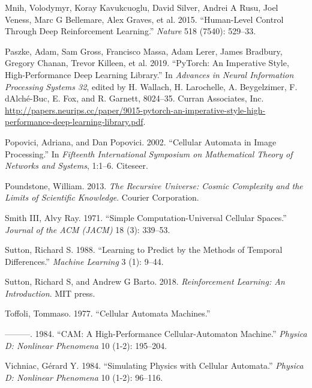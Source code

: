 \documentclass[
  openany]{book}
\newlength{\cslhangindent}
\newenvironment{cslreferences}%
  {\setlength{\parindent}{0pt}%
  \everypar{\setlength{\hangindent}{\cslhangindent}}\ignorespaces}%
  {\par}
\begin{document}
\begin{cslreferences}
\leavevmode\hypertarget{ref-mnih2015human}{}%
Mnih, Volodymyr, Koray Kavukcuoglu, David Silver, Andrei A Rusu, Joel Veness, Marc G Bellemare, Alex Graves, et al. 2015. ``Human-Level Control Through Deep Reinforcement Learning.'' \emph{Nature} 518 (7540): 529--33.

\leavevmode\hypertarget{ref-NEURIPS2019_9015}{}%
Paszke, Adam, Sam Gross, Francisco Massa, Adam Lerer, James Bradbury, Gregory Chanan, Trevor Killeen, et al. 2019. ``PyTorch: An Imperative Style, High-Performance Deep Learning Library.'' In \emph{Advances in Neural Information Processing Systems 32}, edited by H. Wallach, H. Larochelle, A. Beygelzimer, F. d\textquotesingle Alché-Buc, E. Fox, and R. Garnett, 8024--35. Curran Associates, Inc. \url{http://papers.neurips.cc/paper/9015-pytorch-an-imperative-style-high-performance-deep-learning-library.pdf}.

\leavevmode\hypertarget{ref-popovici2002cellular}{}%
Popovici, Adriana, and Dan Popovici. 2002. ``Cellular Automata in Image Processing.'' In \emph{Fifteenth International Symposium on Mathematical Theory of Networks and Systems}, 1:1--6. Citeseer.

\leavevmode\hypertarget{ref-poundstone2013recursive}{}%
Poundstone, William. 2013. \emph{The Recursive Universe: Cosmic Complexity and the Limits of Scientific Knowledge}. Courier Corporation.

\leavevmode\hypertarget{ref-smith1971simple}{}%
Smith III, Alvy Ray. 1971. ``Simple Computation-Universal Cellular Spaces.'' \emph{Journal of the ACM (JACM)} 18 (3): 339--53.

\leavevmode\hypertarget{ref-sutton1988learning}{}%
Sutton, Richard S. 1988. ``Learning to Predict by the Methods of Temporal Differences.'' \emph{Machine Learning} 3 (1): 9--44.

\leavevmode\hypertarget{ref-sutton2018reinforcement}{}%
Sutton, Richard S, and Andrew G Barto. 2018. \emph{Reinforcement Learning: An Introduction}. MIT press.

\leavevmode\hypertarget{ref-toffoli1977cellular}{}%
Toffoli, Tommaso. 1977. ``Cellular Automata Machines.''

\leavevmode\hypertarget{ref-toffoli1984cam}{}%
---------. 1984. ``CAM: A High-Performance Cellular-Automaton Machine.'' \emph{Physica D: Nonlinear Phenomena} 10 (1-2): 195--204.

\leavevmode\hypertarget{ref-vichniac1984simulating}{}%
Vichniac, Gérard Y. 1984. ``Simulating Physics with Cellular Automata.'' \emph{Physica D: Nonlinear Phenomena} 10 (1-2): 96--116.


\end{cslreferences}
\end{document}
